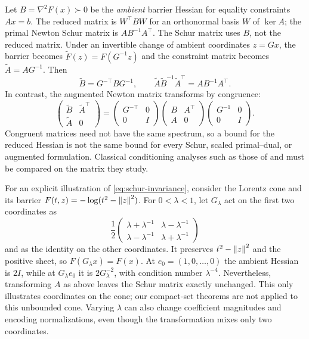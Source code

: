 Let $B=\nabla^2F(x)\succ0$ be the \emph{ambient} barrier Hessian for
equality constraints $Ax=b$. The reduced matrix is $W^\top BW$ for an orthonormal basis $W$
of $\ker A$; the primal Newton Schur matrix is $AB^{-1}A^\top$.
The Schur matrix uses $B$, not the reduced matrix. Under an invertible
change of ambient coordinates $z=Gx$, the barrier becomes
$\widetilde F(z)=F(G^{-1}z)$ and the constraint matrix becomes
$\widetilde A=AG^{-1}$. Then
\begin{equation}
 \widetilde B=G^{-\top}BG^{-1},\qquad
 \widetilde A\widetilde B^{-1}\widetilde A^\top
 =AB^{-1}A^\top.
 \label{eq:schur-invariance}
\end{equation}
In contrast, the augmented Newton matrix transforms by congruence:
\begin{equation}
 \begin{pmatrix}\widetilde B&\widetilde A^\top\\
                 \widetilde A&0\end{pmatrix}
 =\begin{pmatrix}G^{-\top}&0\\0&I\end{pmatrix}
   \begin{pmatrix}B&A^\top\\A&0\end{pmatrix}
   \begin{pmatrix}G^{-1}&0\\0&I\end{pmatrix}.
 \label{eq:kkt-congruence}
\end{equation}
Congruent matrices need not have the same spectrum, so a bound for the
reduced Hessian is not the same bound for every Schur, scaled
primal--dual, or augmented formulation. Classical conditioning analyses
such as those of \citet{pena2002} and \citet{renegar1996} must be compared on the matrix
they study.

For an explicit illustration of \eqref{eq:schur-invariance}, consider
the Lorentz cone and its barrier
$F(t,z)=-\log(t^2-\left\lVert z\right\rVert^2)$. For $0<\lambda<1$, let $G_\lambda$
act on the first two coordinates as
\[
 \frac12\begin{pmatrix}
 \lambda+\lambda^{-1}&\lambda-\lambda^{-1}\\
 \lambda-\lambda^{-1}&\lambda+\lambda^{-1}
 \end{pmatrix}
\]
and as the identity on the other coordinates. It preserves
$t^2-\left\lVert z\right\rVert^2$ and the positive sheet, so
$F(G_\lambda x)=F(x)$. At $e_0=(1,0,\ldots,0)$ the ambient Hessian
is $2I$, while at $G_\lambda e_0$ it is $2G_\lambda^{-2}$, with
condition number $\lambda^{-4}$. Nevertheless, transforming $A$
as above leaves the Schur matrix exactly unchanged. This only
illustrates coordinates on the cone; our compact-set theorems are not
applied to this unbounded cone. Varying $\lambda$ can also change
coefficient magnitudes and encoding normalizations, even though the transformation mixes
only two coordinates.

